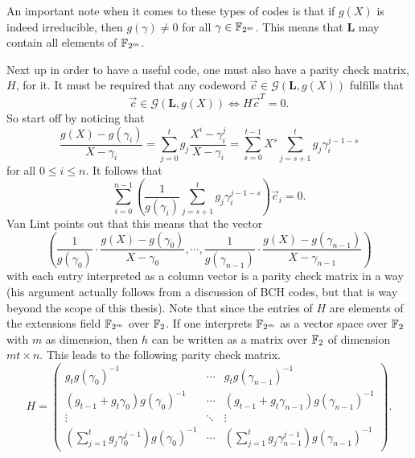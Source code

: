 An important note when it comes to these types of codes is that if $g\left(X\right)$ is indeed irreducible, then $g\left(\gamma\right) \neq 0$ for all $\gamma \in \mathbb{F}_{2^m}$. This means that $\mathbf{L}$ may contain all elements of $\mathbb{F}_{2^m}$.

Next up in order to have a useful code, one must also have a parity check matrix, $H$, for it. It must be required that any codeword $\vec{c} \in \mathcal{G}\left(\mathbf{L},g\left(X\right)\right)$ fulfills that
\begin{equation}
\label{eq:condForH}
	\vec{c} \in \mathcal{G}\left(\mathbf{L},g\left(X\right)\right) \Leftrightarrow H \vec{c}^T = 0.
\end{equation}
So start off by noticing that
\[	
	\frac{g\left(X\right) - g\left(\gamma_i\right)}{X - \gamma_i} = \sum\limits_{j=0}^t g_j \frac{X^i - \gamma_i^j}{X - \gamma_i} = \sum\limits_{s=0}^{t-1} X^s \sum\limits_{j = s+1}^{t} g_j \gamma_i^{j - 1 - s}
\]
for all $0 \leq i \leq n$. It follows that
\[	
	\sum\limits_{i=0}^{n-1} \left( \frac{1}{g\left(\gamma_i\right)} \sum\limits_{j=s+1}^{t} g_j \gamma_i^{j - 1 - s} \right) \vec{c}_i = 0.
\]
Van Lint points out that this means that the vector
\[	
	\left( \frac{1}{g\left(\gamma_0\right)} \cdot \frac{g\left(X\right) - g\left(\gamma_0\right)}{X - \gamma_0}, \cdots , \frac{1}{g\left(\gamma_{n-1}\right)} \cdot \frac{g\left(X\right) - g\left(\gamma_{n-1}\right)}{X - \gamma_{n-1}} \right)
\]
with each entry interpreted as a column vector is a parity check matrix in a way\\
\cite[p. 140]{vanlint} (his argument actually follows from a discussion of BCH codes, but that is way beyond the scope of this thesis). Note that since the entries of $H$ are elements of the extensions field $\mathbb{F}_{2^m}$ over $\mathbb{F}_2$. If one interprets $\mathbb{F}_{2^m}$ as a vector space over $\mathbb{F}_2$ with $m$ as dimension, then $h$ can be written as a matrix over $\mathbb{F}_2$ of dimension $mt \times n$. This leads to the following parity check matrix.
\[
	H = \begin{pmatrix}
		g_t g\left(\gamma_0\right)^{-1} & \cdots & g_t g\left(\gamma_{n - 1}\right)^{-1}\\
		\left(g_{t-1} + g_t \gamma_0\right)g\left(\gamma_0\right)^{-1} & \cdots & \left(g_{t-1} + g_t \gamma_{n-1}\right)g\left(\gamma_{n-1}\right)^{-1}\\
		\vdots & \ddots & \vdots\\
		\left( \sum\limits_{j=1}^{t} g_j \gamma_0^{j-1} \right) g\left(\gamma_0\right)^{-1} & \cdots & \left( \sum\limits_{j=1}^{t} g_j \gamma_{n-1}^{j-1} \right) g\left(\gamma_{n-1}\right)^{-1}
	\end{pmatrix}.
\]
